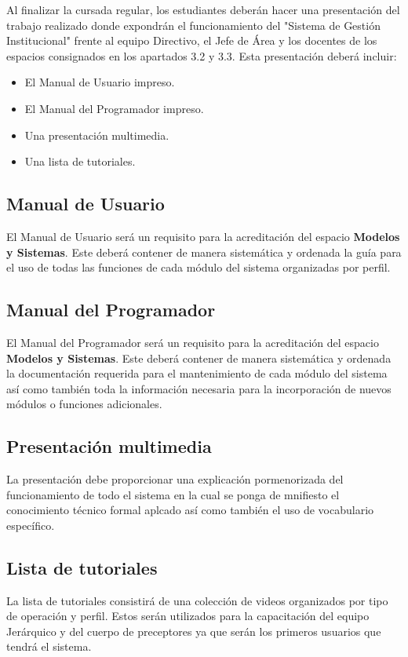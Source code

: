 Al finalizar la cursada regular, los estudiantes deberán hacer una presentación del trabajo realizado donde expondrán el funcionamiento del "Sistema de Gestión Institucional" frente al equipo Directivo, el Jefe de Área y los docentes de los espacios consignados en los apartados 3.2 y 3.3. Esta presentación deberá incluir:

\begin{itemize}
    \item El Manual de Usuario impreso.
    \item El Manual del Programador impreso.
    \item Una presentación multimedia.
    \item Una lista de tutoriales. 
\end{itemize}

\subsection{Manual de Usuario}

El Manual de Usuario será un requisito para la acreditación del espacio \textbf{Modelos y Sistemas}. Este deberá contener de manera  sistemática y ordenada la guía para el uso de todas las funciones de cada módulo del sistema organizadas por perfil.

\subsection{Manual del Programador}

El Manual del Programador será un requisito para la acreditación del espacio \textbf{Modelos y Sistemas}. Este deberá contener de manera sistemática y ordenada la documentación requerida para el mantenimiento de cada módulo del sistema así como también toda la información necesaria para la incorporación de nuevos módulos o funciones adicionales.

\subsection{Presentación multimedia}

La presentación debe proporcionar una explicación pormenorizada del funcionamiento de todo el sistema en la cual se ponga de mnifiesto el conocimiento técnico formal aplcado así como también el uso de vocabulario específico. 

\subsection{Lista de tutoriales}

La lista de tutoriales consistirá de una colección de videos organizados por tipo de operación y perfil. Estos serán utilizados para la capacitación del equipo Jerárquico y del cuerpo de preceptores ya que serán los primeros usuarios que tendrá el sistema. 
